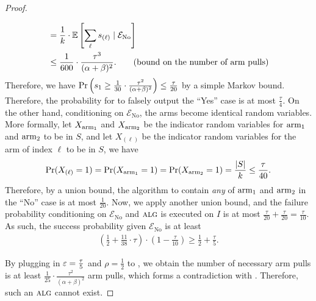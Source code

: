 \begin{proof}
\begin{enumerate}[label=\roman*).]
\begin{align*}
			&= \frac{1}{k}\cdot \operatorname*{{\mathbb{E}}}\left[\sum_{\ell} s_{(\ell)}\mid \mathcal{E}_{\text{No}}\right]\\
			&\leq \frac{1}{600}\cdot \frac{\tau^3}{(\alpha+\beta)^2}. \tag{bound on the number of arm pulls}
		\end{align*}
		Therefore, we have $\operatorname*{\textnormal{Pr}}\left(s_1\geq \frac{1}{30} \cdot \frac{\tau^2}{(\alpha+\beta)^2}\right)\leq \frac{\tau}{20}$ by a simple Markov bound. Therefore, the probability for  to falsely output the ``Yes'' case is at most $\frac{\tau}{4}$. On the other hand, conditioning on $\mathcal{E}_{\text{No}}$, the arms become identical random variables. More formally, let $X_{\textnormal{arm}_1}$ and $X_{\textnormal{arm}_2}$ be the indicator random variables for $\textnormal{arm}_1$ and $\textnormal{arm}_2$ to be in $S$, and let $X_{(\ell)}$ %
		be the indicator random variables for the arm of index $\ell$ to be in $S$, we have
		\begin{align*}
			\operatorname*{\textnormal{Pr}}(X_{(\ell)}=1) = \operatorname*{\textnormal{Pr}}(X_{\textnormal{arm}_{1}}=1) = \operatorname*{\textnormal{Pr}}(X_{\textnormal{arm}_{2}} = 1) = \frac{\left\vert{S}\right\vert}{k}\leq \frac{\tau}{40}.
		\end{align*} %
		Therefore, by a union bound, the algorithm to contain \emph{any} of $\textnormal{arm}_{1}$ and $\textnormal{arm}_{2}$ in the ``No'' case is at most $\frac{1}{20}$.
		Now, we apply another union bound, and the failure probability conditioning on $\mathcal{E}_{\text{No}}$ and $\mbox{\sc alg}$ is executed on $I$ is at most $\frac{\tau}{20}+\frac{\tau}{20}=\frac{\tau}{10}$. As such, the success probability given $\mathcal{E}_{\text{No}}$ is at least
		\begin{align*}
			(\frac{1}{2}+\frac{11}{38}\cdot \tau)\cdot (1-\frac{\tau}{10}) \geq \frac{1}{2}+\frac{\tau}{5}.
		\end{align*}
	\end{enumerate}
	By plugging in $\varepsilon=\frac{\tau}{5}$ and $\rho=\frac{1}{2}$ to , we obtain the number of necessary arm pulls is at least $\frac{1}{25}\cdot \frac{\tau^2}{(\alpha+\beta)^2}$ arm pulls, which forms a contradiction with . Therefore, such an $\mbox{\sc alg}$ cannot exist.
	
	\FloatBarrier
\end{proof}


